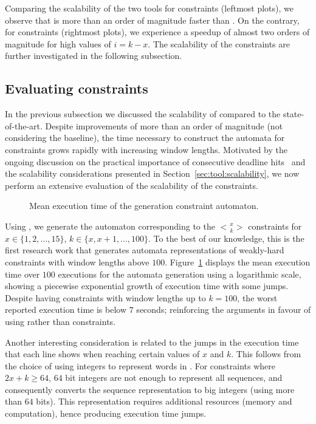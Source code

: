 Comparing the scalability of the two tools for \tAH{} constraints (leftmost plots), we observe that \tool{} is more than an order of magnitude faster than \toolLinsenmayer{}.
On the contrary, for \tRH{} constraints (rightmost plots), we experience a speedup of almost two orders of magnitude for high values of $i = k - x$.
The scalability of the \tRH{} constraints are further investigated in the following subsection.

\subsection{Evaluating \tRH{} constraints}
\label{sec:rowhit_evaluation}

In the previous subsection we discussed the scalability of \tool{} compared to the state-of-the-art.
Despite improvements of more than an order of magnitude (not considering the baseline), the time necessary to construct the automata for \tAH{} constraints grows rapidly with increasing window lengths.
Motivated by the ongoing discussion on the practical importance of consecutive deadline hits~\cite{Akesson:2020, Vreman:2021} and the scalability considerations presented in Section~\ref{sec:tool:scalability}, we now perform an extensive evaluation of the scalability of the \tRH{} constraints.

\begin{figure}[t]
    
    \caption{Mean execution time of the generation \tRH{} constraint automaton.}
    \label{fig:extensive_rowhit}
\end{figure}

Using \tool{}, we generate the automaton corresponding to the \tRH{} $\genfrac{<}{>}{0pt}{}{x}{k}$ constraints for $x \in \{1,2,\dots,15\}$, $k \in \{x,x+1,\dots,100\}$.
To the best of our knowledge, this is the first research work that generates automata representations of weakly-hard constraints with window lengths above $100$.
Figure~\ref{fig:extensive_rowhit} displays the mean execution time over $100$ executions for the automata generation using a logarithmic scale, showing a piecewise exponential growth of execution time with some jumps.
Despite having constraints with window lengths up to $k=100$, the worst reported execution time is below $7$ seconds; reinforcing the arguments in favour of using \tRH{} rather than \tAH{} constraints.

Another interesting consideration is related to the jumps in the execution time that each line shows when reaching certain values of $x$ and $k$.
This follows from the choice of using integers to represent words in \tool{}.
For constraints where $2x+k \geq 64$, $64$ bit integers are not enough to represent all sequences, and \tool{} consequently converts the sequence representation to big integers (using more than $64$ bits).
This representation requires additional resources (memory and computation), hence producing execution time jumps.

